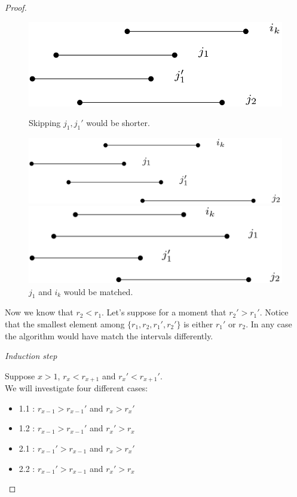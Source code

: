 \documentclass[12pt]{article}
\begin{document}
\begin{proof}
    \begin{figure}[H]
        \centering
        \includegraphics[scale= 0.2]{init_1.png}
        \caption{Skipping $j_1, j_1'$ would be shorter.}
        \includegraphics[scale = 0.2]{init_2.png}
        \caption{$j_1$ and $i_k$ would be matched. }
        \includegraphics[scale = 0.2]{init_3.png}
    \end{figure}

    Now we know that $r_2 < r_1$. Let's suppose for a moment that $r_2' > r_1'$. Notice that the smallest element among $\{r_1, r_2, r_1', r_2'\}$ is either $r_1'$ or $r_2$. 
    In any case the algorithm would have match the intervals differently.     

    \textit{Induction step}
    \vspace{\baselineskip}

    Suppose $x > 1$, $r_x < r_{x+1}$ and $r_x' < r_{x+1}'$. \\
    We will investigate four different cases:
    \begin{itemize}
        \item 1.1 : $r_{x-1} > r_{x-1}'$ and $r_x > r_x'$
        \item 1.2 : $r_{x-1} > r_{x-1}'$ and $r_x'>r_x$
        \item 2.1 : $r_{x-1}' > r_{x-1}$ and $r_x > r_x'$
        \item 2.2 : $r_{x-1}' > r_{x-1}$ and $r_x' > r_x$
    \end{itemize}


\end{proof}
\end{document}
